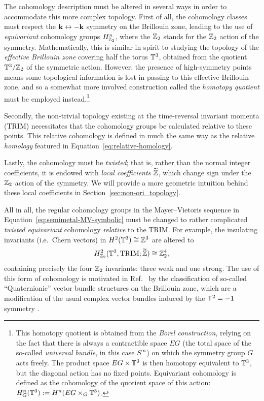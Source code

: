 The cohomology description must be altered in several ways in order to accommodate this more complex topology. First of all, the cohomology classes must respect the $\vb{k}\leftrightarrow-\vb{k}$ symmetry on the Brillouin zone, leading to the use of \emph{equivariant} cohomology groups $H_{\mathbb{Z}_2}^n$, where the $\mathbb{Z}_2$ stands for the $\mathbb{Z}_2$ action of the symmetry. Mathematically, this is similar in spirit to studying the topology of the \emph{effective Brillouin zone} covering half the torus $\mathbb{T}^3$, obtained from the quotient $\mathbb{T}^3/\mathbb{Z}_2$ of the symmetric action. However, the presence of high-symmetry points means some topological information is lost in passing to this effective Brillouin zone, and so a somewhat more involved construction called the \emph{homotopy quotient} must be employed instead.\footnote{
	This homotopy quotient is obtained from the \emph{Borel construction}, relying on the fact that there is always a contractible space $EG$ (the total space of the so-called \emph{universal bundle}, in this case $S^\infty$) on which the symmetry group $G$ acts freely. The product space $EG\times\mathbb{T}^3$ is then homotopy equivalent to $\mathbb{T}^3$, but the diagonal action has no fixed points. Equivariant cohomology is defined as the cohomology of the quotient space of this action: $H_G^n(\mathbb{T}^3) := H^n(EG\times_G\mathbb{T}^3)$.}

Secondly, the non-trivial topology existing at the time-reversal invariant momenta (TRIM) necessitates that the cohomology groups be calculated relative to these points. This relative cohomology is defined in much the same way as the relative \emph{homology} featured in Equation~\eqref{eq:relative-homology}.

Lastly, the cohomology must be \emph{twisted}; that is, rather than the normal integer coefficients, it is endowed with \emph{local coefficients} $\widetilde{\mathbb{Z}}$, which change sign under the $\mathbb{Z}_2$ action of the symmetry. We will provide a more geometric intuition behind these local coefficients in Section~\ref{sec:non-ori_topology}.

All in all, the regular cohomology groups in the Mayer--Vietoris sequence in Equation~\eqref{eq:semimetal-MV-symbolic} must be changed to rather complicated \emph{twisted equivariant} cohomology \emph{relative} to the TRIM. For example, the insulating invariants (i.e.\ Chern vectors) in $H^2(\mathbb{T}^3)\cong\mathbb{Z}^3$ are altered to
\begin{equation*}
	H_{\mathbb{Z}_2}^2(\mathbb{T}^3, \text{TRIM}; \widetilde{\mathbb{Z}}) \cong \mathbb{Z}_2^4,
\end{equation*}
containing precisely the four $\mathbb{Z}_2$ invariants: three weak and one strong. The use of this form of cohomology is motivated in Ref.~\cite{Thiang_equivariant} by the classification of so-called ``Quaternionic'' vector bundle structures on the Brillouin zone, which are a modification of the usual complex vector bundles induced by the $\mathsf{T}^2=-1$ symmetry \cite{NittisGomi_Quaternionic,NittisGomi_FKMM}.

